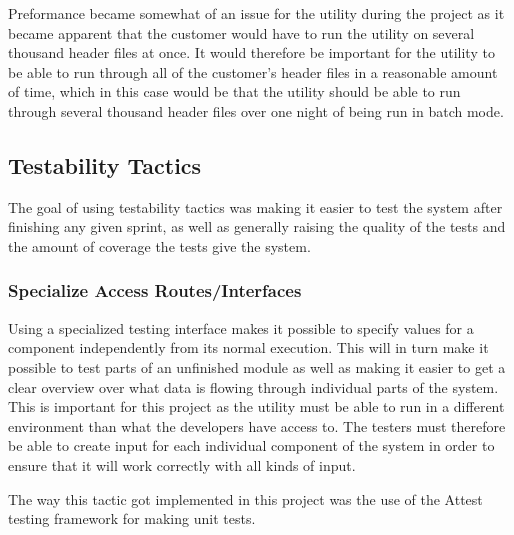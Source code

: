Preformance became somewhat of an issue for the utility during the project as it became apparent that the customer would have to run the utility on several thousand header files at once. It would therefore be important for the utility to be able to run through all of the customer's header files in a reasonable amount of time, which in this case would be that the utility should be able to run through several thousand header files over one night of being run in batch mode.

\subsection{Testability Tactics}
The goal of using testability tactics was making it easier to test the system after finishing any given sprint, as well as generally raising the quality of the tests and the amount of coverage the tests give the system.

\subsubsection{Specialize Access Routes/Interfaces}
Using a specialized testing interface makes it possible to specify values for a component independently from its normal execution. This will in turn make it possible to test parts of an unfinished module as well as making it easier to get a clear overview over what data is flowing through individual parts of the system. This is important for this project as the \gls{utility} must be able to run in a different environment than what the developers have access to. The testers must therefore be able to create input for each individual component of the system in order to ensure that it will work correctly with all kinds of input.

The way this tactic got implemented in this project was the use of the Attest testing framework for making unit tests.
